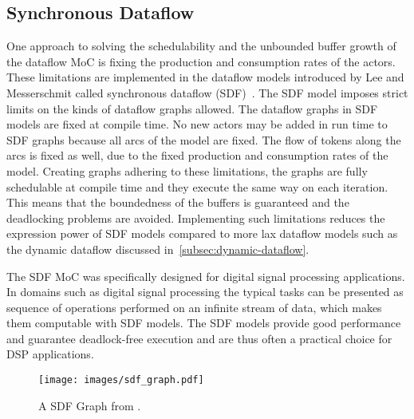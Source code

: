\subsection{Synchronous Dataflow}
\label{subsec:synchronous-dataflow}
\FloatBarrier
One approach to solving the schedulability and the unbounded buffer growth of the dataflow MoC is fixing the production and consumption rates of the actors. These limitations are implemented in the dataflow models introduced by Lee and Messerschmit called synchronous dataflow (SDF)~\cite{lee1987synchronous}. The SDF model imposes strict limits on the kinds of dataflow graphs allowed. The dataflow graphs in SDF models are fixed at compile time. No new actors may be added in run time to SDF graphs because all arcs of the model are fixed. The flow of tokens along the arcs is fixed as well, due to the fixed production and consumption rates of the model. Creating graphs adhering to these limitations, the graphs are fully schedulable at compile time and they execute the same way on each iteration. This means that the boundedness of the buffers is guaranteed and the deadlocking problems are avoided. Implementing such limitations reduces the expression power of SDF models compared to more lax dataflow models such as the dynamic dataflow discussed in~\ref{subsec:dynamic-dataflow}.~\cite{lee2015introduction}

The SDF MoC was specifically designed for digital signal processing applications. In domains such as digital signal processing the typical tasks can be presented as sequence of operations performed on an infinite stream of data, which makes them computable with SDF models. The SDF models provide good performance and guarantee deadlock-free execution and are thus often a practical choice for DSP applications.~\cite{lee2015introduction}

\begin{figure}[h!]
    \begin{center}
        \texttt{[image: images/sdf\_graph.pdf]}
        \caption{A SDF Graph from \cite{ade1997data}.}
        \label{fig:sdf_graph}
    \end{center}
\end{figure}

